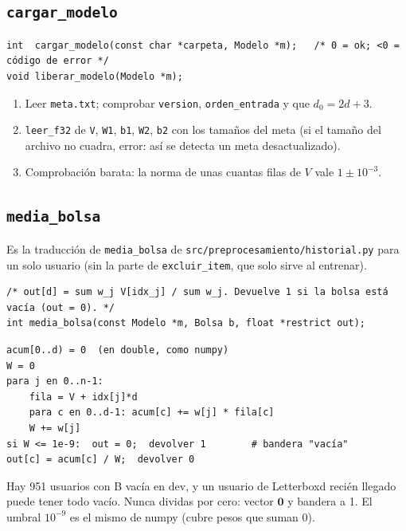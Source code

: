 \documentclass[a4paper,11pt]{article}
\newcommand{\cod}[1]{\texttt{#1}}
\begin{document}
\subsection{\texttt{cargar\_modelo}}
\begin{lstlisting}[style=c]
int  cargar_modelo(const char *carpeta, Modelo *m);   /* 0 = ok; <0 = código de error */
void liberar_modelo(Modelo *m);
\end{lstlisting}
\begin{enumerate}
  \item Leer \cod{meta.txt}; comprobar \cod{version}, \cod{orden\_entrada} y que $d_0 = 2d + 3$.
  \item \cod{leer\_f32} de \cod{V}, \cod{W1}, \cod{b1}, \cod{W2}, \cod{b2} con los tamaños del meta (si el tamaño del
        archivo no cuadra, error: así se detecta un meta desactualizado).
  \item Comprobación barata: la norma de unas cuantas filas de $V$ vale $1 \pm 10^{-3}$.
\end{enumerate}

\subsection{\texttt{media\_bolsa}}
Es la traducción de \cod{media\_bolsa} de \cod{src/preprocesamiento/historial.py} para un solo usuario (sin la parte
de \cod{excluir\_item}, que solo sirve al entrenar).
\begin{lstlisting}[style=c]
/* out[d] = sum w_j V[idx_j] / sum w_j. Devuelve 1 si la bolsa está vacía (out = 0). */
int media_bolsa(const Modelo *m, Bolsa b, float *restrict out);
\end{lstlisting}
\begin{lstlisting}
acum[0..d) = 0  (en double, como numpy)
W = 0
para j en 0..n-1:
    fila = V + idx[j]*d
    para c en 0..d-1: acum[c] += w[j] * fila[c]
    W += w[j]
si W <= 1e-9:  out = 0;  devolver 1        # bandera "vacía"
out[c] = acum[c] / W;  devolver 0
\end{lstlisting}
\begin{ojo}
Hay 951 usuarios con B vacía en dev, y un usuario de Letterboxd recién llegado puede tener todo vacío. Nunca dividas
por cero: vector $\mathbf{0}$ y bandera a 1. El umbral $10^{-9}$ es el mismo de numpy (cubre pesos que suman 0).
\end{ojo}
\end{document}
